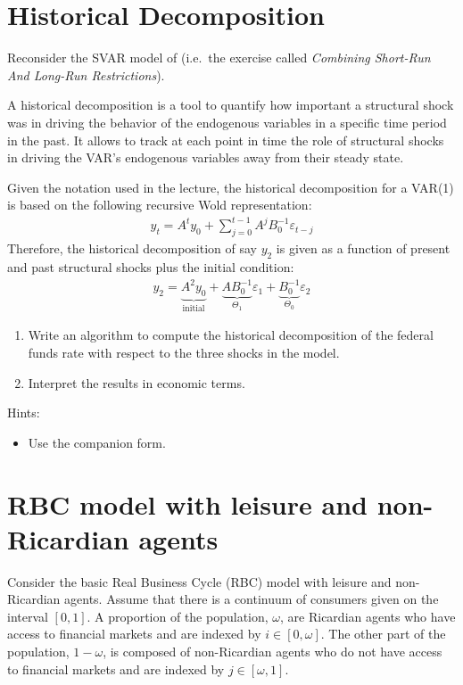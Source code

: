 \documentclass{article}
\begin{document}
\newpage

\section[Historical Decomposition]{Historical Decomposition}
Reconsider the SVAR model of \textcite{Rubio-Ramirez.Waggoner.Zha_2010_StructuralVectorAutoregressions}
  (i.e.\ the exercise called \emph{Combining Short-Run And Long-Run Restrictions}).

A historical decomposition is a tool to quantify how important a structural shock was
  in driving the behavior of the endogenous variables in a specific time period in the past.
It allows to track at each point in time the role of structural shocks
  in driving the VAR's endogenous variables away from their steady state.

Given the notation used in the lecture, the historical decomposition for a VAR{(1)}
  is based on the following recursive Wold representation:
\begin{align*}
y_t = A^t y_0 + \sum_{j=0}^{t-1} A^j B_0^{-1} \varepsilon_{t-j}
\end{align*}
Therefore, the historical decomposition of say \(y_{2}\) is given
  as a function of present and past structural shocks
  plus the initial condition:
\begin{align*}
y_{2} = \underbrace{A^2 y_0}_{\text{initial}} + \underbrace{A B_0^{-1}}_{\Theta_1} \varepsilon_{1} + \underbrace{B_0^{-1}}_{\Theta_0} \varepsilon_{2}
\end{align*}

\begin{enumerate}
\item Write an algorithm to compute the historical decomposition of the federal funds rate with respect to the three shocks in the model.
\item Interpret the results in economic terms.
\end{enumerate}

Hints:
\begin{itemize}
\item Use the companion form.
\end{itemize} 

\newpage

\section{RBC model with leisure and non-Ricardian agents}
Consider the basic Real Business Cycle (RBC) model with leisure and non-Ricardian agents.
Assume that there is a continuum of consumers given on the interval \([0,1]\).
A proportion of the population, \(\omega \), are Ricardian agents
  who have access to financial markets and are indexed by \(i \in [0,\omega]\).
The other part of the population, \(1-\omega \), is composed of non-Ricardian agents
  who do not have access to financial markets and are indexed by \(j \in [\omega,1]\).
\end{document}
